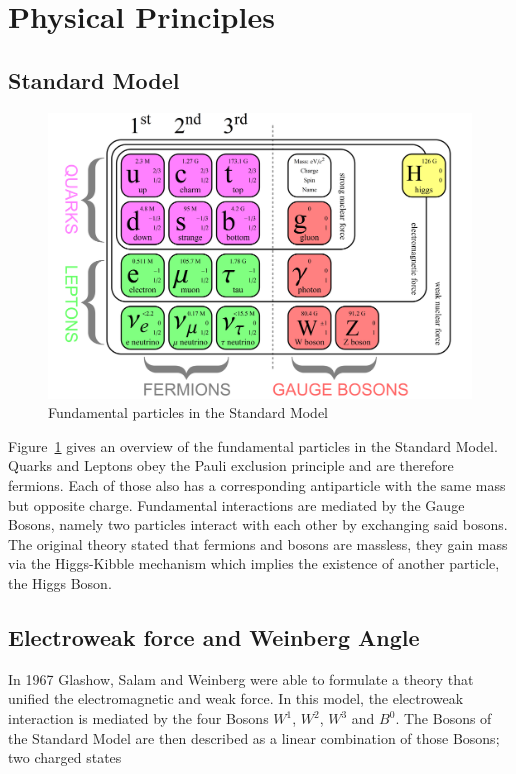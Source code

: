 
\section{Physical Principles}
\subsection{Standard Model}
\begin{figure}[hb]
	\centering
	\includegraphics[scale=0.4]{graphics/SM1.png}
	\caption[Standard Model]{Fundamental particles in the Standard Model\cite{uni zuerich}} 
	\label{fig:principles:Standard_Model_of_Elementary_Particles}
\end{figure}

Figure~\ref{fig:principles:Standard_Model_of_Elementary_Particles} gives an overview of the fundamental particles in the Standard Model. Quarks and Leptons obey the Pauli exclusion principle and are therefore fermions. Each of those also has a corresponding antiparticle with the same mass but opposite charge. Fundamental interactions are mediated by the Gauge Bosons, namely two particles interact with each other by exchanging said bosons. The original theory stated that fermions and bosons are massless, they gain mass via the Higgs-Kibble mechanism which implies the existence of another particle, the Higgs Boson\cite{muenchen}.

\subsection{Electroweak force and Weinberg Angle}
In 1967 Glashow, Salam and Weinberg were able to formulate a theory that unified the electromagnetic and weak force. In this model, the electroweak interaction is mediated by the four Bosons $W^1$, $W^2$, $W^3$ and $B^0$. The Bosons of the Standard Model are then described as a linear combination of those Bosons; two charged states

